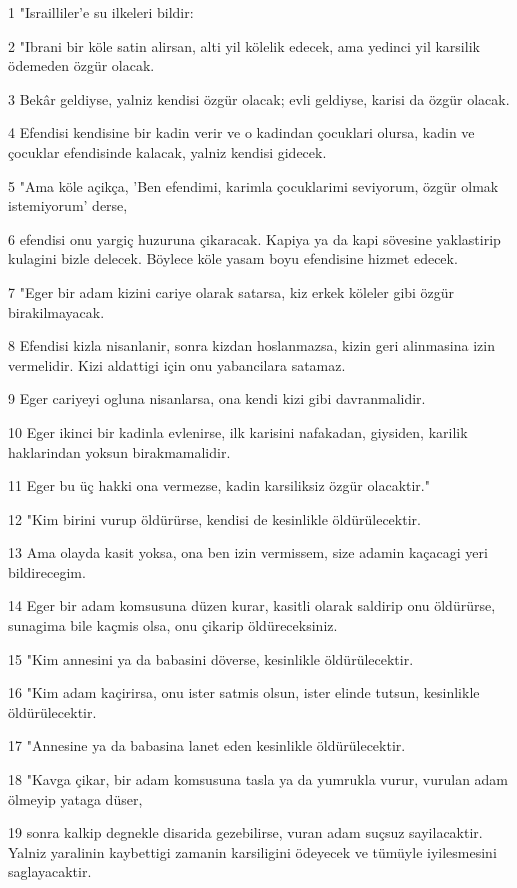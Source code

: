 \par 1 "Israilliler'e su ilkeleri bildir:
\par 2 "Ibrani bir köle satin alirsan, alti yil kölelik edecek, ama yedinci yil karsilik ödemeden özgür olacak.
\par 3 Bekâr geldiyse, yalniz kendisi özgür olacak; evli geldiyse, karisi da özgür olacak.
\par 4 Efendisi kendisine bir kadin verir ve o kadindan çocuklari olursa, kadin ve çocuklar efendisinde kalacak, yalniz kendisi gidecek.
\par 5 "Ama köle açikça, 'Ben efendimi, karimla çocuklarimi seviyorum, özgür olmak istemiyorum' derse,
\par 6 efendisi onu yargiç huzuruna çikaracak. Kapiya ya da kapi sövesine yaklastirip kulagini bizle delecek. Böylece köle yasam boyu efendisine hizmet edecek.
\par 7 "Eger bir adam kizini cariye olarak satarsa, kiz erkek köleler gibi özgür birakilmayacak.
\par 8 Efendisi kizla nisanlanir, sonra kizdan hoslanmazsa, kizin geri alinmasina izin vermelidir. Kizi aldattigi için onu yabancilara satamaz.
\par 9 Eger cariyeyi ogluna nisanlarsa, ona kendi kizi gibi davranmalidir.
\par 10 Eger ikinci bir kadinla evlenirse, ilk karisini nafakadan, giysiden, karilik haklarindan yoksun birakmamalidir.
\par 11 Eger bu üç hakki ona vermezse, kadin karsiliksiz özgür olacaktir."
\par 12 "Kim birini vurup öldürürse, kendisi de kesinlikle öldürülecektir.
\par 13 Ama olayda kasit yoksa, ona ben izin vermissem, size adamin kaçacagi yeri bildirecegim.
\par 14 Eger bir adam komsusuna düzen kurar, kasitli olarak saldirip onu öldürürse, sunagima bile kaçmis olsa, onu çikarip öldüreceksiniz.
\par 15 "Kim annesini ya da babasini döverse, kesinlikle öldürülecektir.
\par 16 "Kim adam kaçirirsa, onu ister satmis olsun, ister elinde tutsun, kesinlikle öldürülecektir.
\par 17 "Annesine ya da babasina lanet eden kesinlikle öldürülecektir.
\par 18 "Kavga çikar, bir adam komsusuna tasla ya da yumrukla vurur, vurulan adam ölmeyip yataga düser,
\par 19 sonra kalkip degnekle disarida gezebilirse, vuran adam suçsuz sayilacaktir. Yalniz yaralinin kaybettigi zamanin karsiligini ödeyecek ve tümüyle iyilesmesini saglayacaktir.
